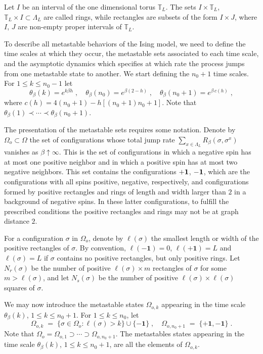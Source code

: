 \documentclass[reqno]{amsart}
\begin{document}
Let $I$ be an interval of the one dimensional torus ${{\mathbb T}}_L$.  The
sets $I\times {{\mathbb T}}_L$, ${{\mathbb T}}_L \times I\subset \Lambda_L$ are called
rings, while rectangles are subsets of the form $I\times J$, where
$I$, $J$ are non-empty proper intervals of ${{\mathbb T}}_L$.

To describe all metastable behaviors of the Ising model, we need to
define the time scales at which they occur, the metastable sets
associated to each time scale, and the asymptotic dynamics which
specifies at which rate the process jumps from one metastable state to
another. We start defining the $n_0+1$ time scales. For $1\le k\le
n_0-1$ let
\begin{equation*}
\theta_\beta (k) = e^{k \beta h}\;, 
\quad \theta_\beta (n_0) = e^{\beta (2-h)}\; , \quad 
\theta_\beta (n_0+1) = e^{\beta \, c(h)}\;,
\end{equation*}
where $c(h) = 4 (n_0+1) - h [(n_0+1)n_0+1]$.  Note that
$\theta_\beta(1) \prec \cdots \prec \theta_{\beta} (n_0+1)$.

The presentation of the metastable sets requires some notation.
Denote by $\Omega_o \subset \Omega$ the set of configurations whose
total jump rate $\sum_{x\in\Lambda_L} R_\beta(\sigma, \sigma^x)$
vanishes as $\beta\uparrow\infty$. This is the set of configurations
in which a negative spin has at most one positive neighbor and in
which a positive spin has at most two negative neighbors. This set
contains the configurations $+ \bf 1$, $- \bf 1$, which are the
configurations with all spins positive, negative, respectively, and
configurations formed by positive rectangles and rings of length and
width larger than $2$ in a background of negative spins.  In these
latter configurations, to fulfill the prescribed conditions the
positive rectangles and rings may not be at graph distance $2$.

For a configuration $\sigma$ in $\Omega_o$, denote by $\ell (\sigma)$
the smallest length or width of the positive rectangles of $\sigma$.
By convention, $\ell ( - {{\mathbf 1}}) = 0$, $\ell ( + {{\mathbf 1}}) = L$ and
$\ell(\sigma)=L$ if $\sigma$ contains no positive rectangles, but only
positive rings. Let $N_r(\sigma)$ be the number of positive
$\ell(\sigma)\times m$ rectangles of $\sigma$ for some
$m>\ell(\sigma)$, and let $N_s(\sigma)$ be the number of positive
$\ell (\sigma) \times \ell (\sigma)$ squares of $\sigma$.

We may now introduce the metastable states $\Omega_{o,k}$ appearing in
the time scale $\theta_\beta (k)$, $1\le k\le n_0+1$. For $1\le k\le
n_0$, let
\begin{equation*}
\Omega_{o,k} \;=\; \{\sigma \in \Omega_o : \ell(\sigma)>k\} \cup 
\{- {{\mathbf 1}}\} \;, \quad \Omega_{o,n_0+1} \;=\; \{+ {{\mathbf 1}} , - {{\mathbf 1}}\} \;.
\end{equation*}
Note that $\Omega_{o} = \Omega_{o,1} \supset \cdots \supset
\Omega_{o,n_0+1}$. The metastables states appearing in the time scale
$\theta_\beta (k)$, $1\le k\le n_0+1$, are all the elements of
$\Omega_{o,k}$.
\end{document}
